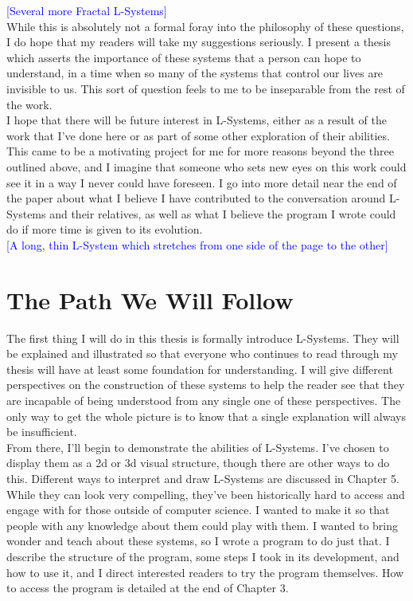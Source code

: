 \documentclass[12pt,twoside]{reedthesis}
\begin{document}
	\textcolor{blue}{[Several more Fractal L-Systems]}\\
	
	While this is absolutely not a formal foray into the philosophy of these questions, I do hope that my readers will take my suggestions seriously. I present a thesis which asserts the importance of these systems that a person can hope to understand, in a time when so many of the systems that control our lives are invisible to us. This sort of question feels to me to be inseparable from the rest of the work.\\
	
	I hope that there will be future interest in L-Systems, either as a result of the work that I’ve done here or as part of some other exploration of their abilities. This came to be a motivating project for me for more reasons beyond the three outlined above, and I imagine that someone who sets new eyes on this work could see it in a way I never could have foreseen. I go into more detail near the end of the paper about what I believe I have contributed to the conversation around L-Systems and their relatives, as well as what I believe the program I wrote could do if more time is given to its evolution.\\
	
	\textcolor{blue}{[A long, thin L-System which stretches from one side of the page to the other]}\\
	
\section{The Path We Will Follow}

	The first thing I will do in this thesis is formally introduce L-Systems. They will be explained and illustrated so that everyone who continues to read through my thesis will have at least some foundation for understanding. I will give different perspectives on the construction of these systems to help the reader see that they are incapable of being understood from any single one of these perspectives. The only way to get the whole picture is to know that a single explanation will always be insufficient.\\
	
	From there, I'll begin to demonstrate the abilities of L-Systems. I've chosen to display them as a 2d or 3d visual structure, though there are other ways to do this. Different ways to interpret and draw L-Systems are discussed in Chapter 5. While they can look very compelling, they've been historically hard to access and engage with for those outside of computer science. I wanted to make it so that people with any knowledge about them could play with them. I wanted to bring wonder and teach about these systems, so I wrote a program to do just that. I describe the structure of the program, some steps I took in its development, and how to use it, and I direct interested readers to try the program themselves. How to access the program is detailed at the end of Chapter 3.\\
	
\end{document}
